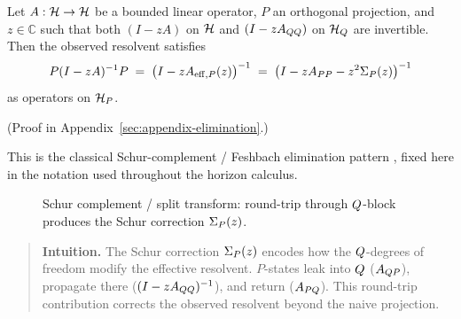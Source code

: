 \begin{theorem}
\label{thm:feshbach-schur}
Let $A:\mathcal{H} \to \mathcal{H}$ be a bounded linear operator, $P$ an orthogonal projection, and $z \in \mathbb{C}$ such that both $(I - zA)$ on $\mathcal{H}$ and $(I - z A_{QQ})$ on $\mathcal{H}_{Q}$ are invertible.
Then the observed resolvent satisfies
\[
P (I - zA)^{-1} P
\;=\;
\bigl( I - z A_{\mathrm{eff},P}(z) \bigr)^{-1}
\;=\;
\bigl( I - z A_{PP} - z^2 \Sigma_{P}(z) \bigr)^{-1}
\]
as operators on $\mathcal{H}_P$.
\end{theorem}

(Proof in Appendix~\ref{sec:appendix-elimination}.)

This is the classical Schur-complement / Feshbach elimination pattern
\cite{Haynsworth1968,Zhang2005,Feshbach1958,Feshbach1962}, fixed here in the
notation used throughout the horizon calculus.

\begin{figure}[ht]
\centering
{}
\caption{Schur complement / split transform: round-trip through $Q$-block produces the Schur correction $\Sigma_{P}(z)$.}
\label{fig:schur-complement}
\end{figure}

\begin{quote}\small
\textbf{Intuition.}
The Schur correction $\Sigma_{P}(z)$ encodes how the $Q$-degrees of freedom modify the effective resolvent.
$P$-states leak into $Q$ ($A_{QP}$), propagate there ($(I - z A_{QQ})^{-1}$), and return ($A_{PQ}$).
This round-trip contribution corrects the observed resolvent beyond the naive projection.
\end{quote}

